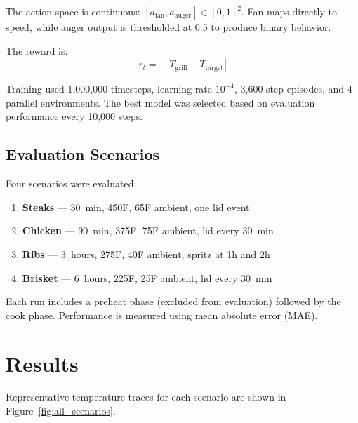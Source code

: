\documentclass{article}
\begin{document}
The action space is continuous: $[a_{\text{fan}}, a_{\text{auger}}] \in [0,1]^2$.
Fan maps directly to speed, while auger output is thresholded at 0.5 to
produce binary behavior.

The reward is:
\begin{equation*}
    r_t = -\left| T_{\text{grill}} - T_{\text{target}} \right|
\end{equation*}

Training used 1,000,000 timesteps, learning rate $10^{-4}$, 3,600-step
episodes, and 4 parallel environments. The best model was selected based
on evaluation performance every 10,000 steps.

\subsection{Evaluation Scenarios}

Four scenarios were evaluated:

\begin{enumerate}
    \item \textbf{Steaks} --- 30~min, 450\textdegree F, 65\textdegree F ambient, one lid event
    \item \textbf{Chicken} --- 90~min, 375\textdegree F, 75\textdegree F ambient, lid every 30~min
    \item \textbf{Ribs} --- 3~hours, 275\textdegree F, 40\textdegree F ambient, spritz at 1h and 2h
    \item \textbf{Brisket} --- 6~hours, 225\textdegree F, 25\textdegree F ambient, lid every 30~min
\end{enumerate}

Each run includes a preheat phase (excluded from evaluation) followed by
the cook phase. Performance is measured using mean absolute error (MAE).

\section{Results}

Representative temperature traces for each scenario are shown in
Figure~\ref{fig:all_scenarios}.
\end{document}
